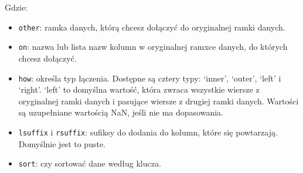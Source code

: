\documentclass[
  polish,
  letterpaper,
  DIV=11,
  numbers=noendperiod]{scrreprt}
\providecommand{\tightlist}{%
  \setlength{\itemsep}{0pt}\setlength{\parskip}{0pt}}
\begin{document}
Gdzie:

\begin{itemize}
\tightlist
\item
  \texttt{other}: ramka danych, którą chcesz dołączyć do oryginalnej
  ramki danych.
\item
  \texttt{on}: nazwa lub lista nazw kolumn w oryginalnej ramxce danych,
  do których chcesz dołączyć.
\item
  \texttt{how}: określa typ łączenia. Dostępne są cztery typy: `inner',
  `outer', `left' i `right'. `left' to domyślna wartość, która zwraca
  wszystkie wiersze z oryginalnej ramki danych i pasujące wiersze z
  drugiej ramki danych. Wartości są uzupełniane wartością NaN, jeśli nie
  ma dopasowania.
\item
  \texttt{lsuffix} i \texttt{rsuffix}: sufiksy do dodania do kolumn,
  które się powtarzają. Domyślnie jest to puste.
\item
  \texttt{sort}: czy sortować dane według klucza.
\end{itemize}
\end{document}

